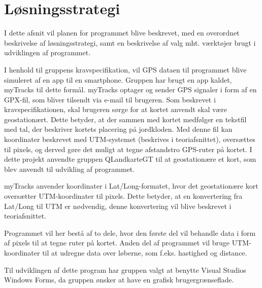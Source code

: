 \chapter{Løsningsstrategi}
I dette afsnit vil planen for programmet blive beskrevet, med en overordnet beskrivelse af løsningsstrategi, samt en beskrivelse af valg mht. værktøjer brugt i udviklingen af programmet.

I henhold til gruppens kravspecifikation, vil GPS dataen til programmet blive simuleret af en app til en smartphone. Gruppen har brugt en app kaldet, myTracks til dette formål. myTracks optager og sender GPS signaler i form af en GPX-fil, som bliver tilsendt via e-mail til brugeren.
Som beskrevet i kravspecifikationen, skal brugeren sørge for at kortet anvendt skal være geostationært. Dette betyder, at der sammen med kortet medfølger en tekstfil med tal, der beskriver kortets placering på jordkloden. Med denne fil kan koordinater beskrevet med UTM-systemet (beskrives i teoriafsnittet), oversættes til pixels, og derved gøre det muligt at tegne afstandstro GPS-ruter på kortet. I dette projekt anvendte gruppen QLandkarteGT til at geostationære et kort, som blev anvendt til udvikling af programmet.

myTracks anvender koordinater i Lat/Long-formatet, hvor det geostationære kort oversætter UTM-koordinater til pixels. Dette betyder, at en konvertering fra Lat/Long til UTM er nødvendig, denne konvertering vil blive beskrevet i teoriafsnittet. 

Programmet vil her bestå af to dele, hvor den første del vil behandle data i form af pixels til at tegne ruter på kortet. Anden del af programmet vil bruge UTM-koordinater til at udregne data over løberne, som f.eks. hastighed og distance.

Til udviklingen af dette program har gruppen valgt at benytte Visual Studios Windows Forms, da gruppen ønsker at have en grafisk brugergrænseflade.
